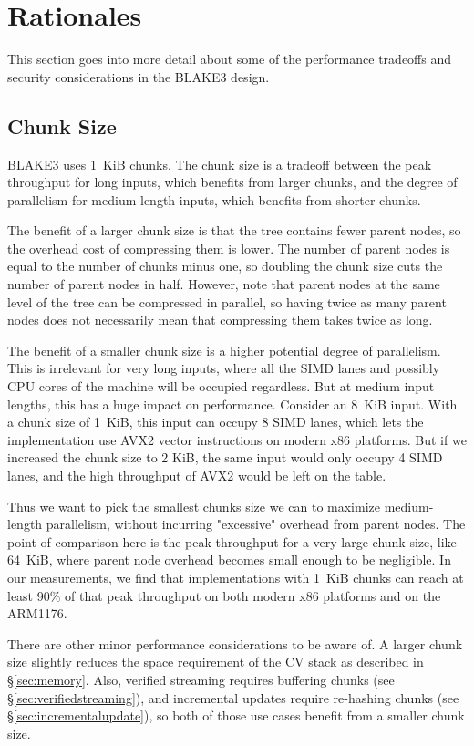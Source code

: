 \documentclass[11pt,notitlepage,a4paper]{article}
\begin{document}
\section{Rationales}\label{sec:rationales}

This section goes into more detail about some of the performance tradeoffs and
security considerations in the BLAKE3 design.

\subsection{Chunk Size}\label{sec:chunksize}

BLAKE3 uses 1~KiB chunks. The chunk size is a tradeoff between the peak
throughput for long inputs, which benefits from larger chunks, and the degree
of parallelism for medium-length inputs, which benefits from shorter chunks.

The benefit of a larger chunk size is that the tree contains fewer parent
nodes, so the overhead cost of compressing them is lower. The number of parent
nodes is equal to the number of chunks minus one, so doubling the chunk size
cuts the number of parent nodes in half. However, note that parent nodes at the
same level of the tree can be compressed in parallel, so having twice as many
parent nodes does not necessarily mean that compressing them takes twice as
long.

The benefit of a smaller chunk size is a higher potential degree of
parallelism. This is irrelevant for very long inputs, where all the SIMD lanes
and possibly CPU cores of the machine will be occupied regardless. But at
medium input lengths, this has a huge impact on performance. Consider an 8~KiB
input. With a chunk size of 1~KiB, this input can occupy 8 SIMD lanes, which
lets the implementation use AVX2 vector instructions on modern x86 platforms.
But if we increased the chunk size to 2 KiB, the same input would only occupy 4
SIMD lanes, and the high throughput of AVX2 would be left on the table.

Thus we want to pick the smallest chunks size we can to maximize medium-length
parallelism, without incurring "excessive" overhead from parent nodes. The
point of comparison here is the peak throughput for a very large chunk size,
like 64~KiB, where parent node overhead becomes small enough to be negligible.
In our measurements, we find that implementations with 1~KiB chunks can reach
at least 90\% of that peak throughput on both modern x86 platforms and on the
ARM1176.

There are other minor performance considerations to be aware of. A larger chunk
size slightly reduces the space requirement of the CV stack as described in
\S\ref{sec:memory}. Also, verified streaming requires buffering chunks (see
\S\ref{sec:verifiedstreaming}), and incremental updates require re-hashing
chunks (see \S\ref{sec:incrementalupdate}), so both of those use cases benefit
from a smaller chunk size.
\end{document}
